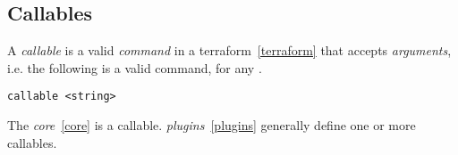 \subsection{Callables}
\label{concepts_callables}

A \emph{callable} is a valid \emph{command} in a terraform~\ref{terraform} that accepts \emph{arguments}, i.e. the following is a valid command, for any .

\begin{verbatim}
callable <string>
\end{verbatim}

The \emph{core}~\ref{core} is a callable. \emph{plugins}~\ref{plugins} generally define one or more callables.